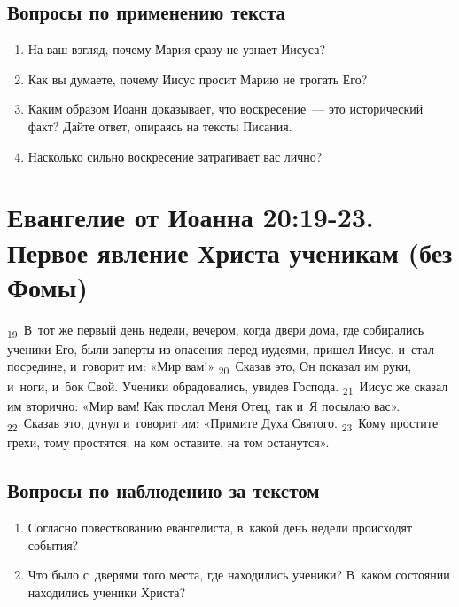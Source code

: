 \documentclass[a4paper,12pt]{article}
\begin{document}
\subsection*{Вопросы по применению текста} 
\begin{enumerate}
    \item На ваш взгляд, почему Мария сразу не узнает Иисуса? 
    
    \myline
    
    \myline
    \item Как вы думаете, почему Иисус просит Марию не трогать Его? 
    
    \myline
    
    \myline
    \item Каким образом Иоанн доказывает, что воскресение~--- это исторический факт? Дайте ответ, опираясь на тексты Писания. 
    
    \myline
    
    \myline
    \item Насколько сильно воскресение затрагивает вас лично? 
    
    \myline
    
    \myline
\end{enumerate}



\section{Евангелие от Иоанна 20:19-23. Первое явление Христа ученикам (без Фомы)}

\textsubscript{19}~В~тот же первый день недели, вечером, когда двери дома, где собирались ученики Его, были заперты из опасения перед иудеями, пришел Иисус, и~стал посредине, и~говорит им: «Мир вам!» \textsubscript{20}~Сказав это, Он показал им руки, и~ноги, и~бок Свой. Ученики обрадовались, увидев Господа. \textsubscript{21}~Иисус же сказал им вторично: «Мир вам! Как послал Меня Отец, так и~Я посылаю вас». \textsubscript{22}~Сказав это, дунул и~говорит им: «Примите Духа Святого. \textsubscript{23}~Кому простите грехи, тому простятся; на ком оставите, на том останутся». 

\subsection*{Вопросы по наблюдению за текстом}
\begin{enumerate}
    \item Согласно повествованию евангелиста, в~какой день недели происходят события? 
    
    \myline
    
    \myline
    \item Что было с~дверями того места, где находились ученики? В~каком состоянии находились ученики Христа? 
    
    \myline
    
    \myline
\end{enumerate}
\end{document}
